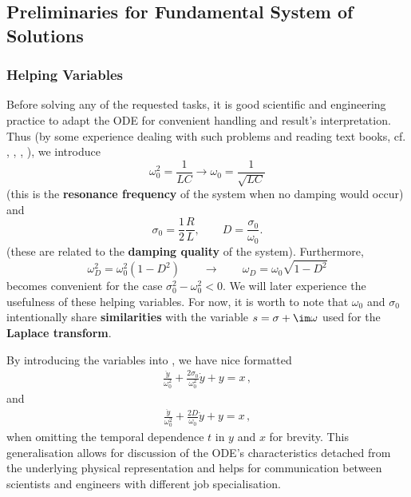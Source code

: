 \subsection{Preliminaries for Fundamental System of Solutions}



\subsubsection{Helping Variables}
Before solving any of the requested tasks, it is good scientific and engineering
practice to adapt the ODE for convenient handling and result's interpretation.
Thus (by some experience dealing with such problems and reading text books, cf.
\cite{LangeSigSys1}, \cite{Goeldner1987},  \cite{Oppenheim1997}, \cite{Strang2014}),
we introduce
\begin{equation}
\omega_0^2 = \frac{1}{L C} \rightarrow \omega_0 = \frac{1}{\sqrt{L C}}
\end{equation}
(this is the \textbf{resonance frequency} of the system when no damping would occur)
and
\begin{equation}
\sigma_0 = \frac{1}{2}\frac{R}{L},
\qquad
D = \frac{\sigma_0}{\omega_0}.
\end{equation}
(these are related to the \textbf{damping quality} of the system).
%
Furthermore,
\begin{equation}
\omega_D^2 = \omega_0^2 (1-D^2) \qquad \rightarrow \qquad \omega_D = \omega_0
\sqrt{1-D^2}
\end{equation}
becomes convenient for the case $\sigma_0^2 - \omega_0^2 < 0$.
We will later experience the usefulness of these helping variables.
For now, it is worth to note that $\omega_0$ and $\sigma_0$ intentionally share
\textbf{similarities} with the variable $s=\sigma + \im \omega$ used for the
\textbf{Laplace transform}.

By introducing the variables into , we have nice formatted
\begin{align}
\label{eq:ODE_sigma0}
\boxed{
\frac{\ddot{y}}{\omega_0^2} + \frac{2 \sigma_0}{\omega_0^2} \dot{y} + y = x
}\,,
\end{align}
and
\begin{align}
\label{eq:ODE_D}
\boxed{
\frac{\ddot{y}}{\omega_0^2} + \frac{2 D}{\omega_0} \dot{y} + y = x}\,,
\end{align}
when omitting the temporal dependence $t$ in $y$ and $x$ for brevity.
%
This generalisation allows for discussion of the ODE's characteristics detached
from the underlying physical representation and helps for communication between
scientists and engineers with different job specialisation.



